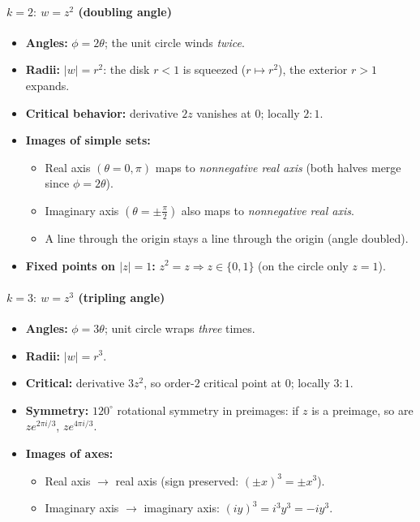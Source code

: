 \documentclass[11pt]{article}
\begin{document}
\paragraph{\(k=2:\ w=z^{2}\) (doubling angle)}
\begin{itemize}
	\item \textbf{Angles:} \(\phi=2\theta\); the unit circle winds \emph{twice}.
	\item \textbf{Radii:} \(|w|=r^{2}\): the disk \(r<1\) is squeezed (\(r\mapsto r^{2}\)), the exterior \(r>1\) expands.
	\item \textbf{Critical behavior:} derivative \(2z\) vanishes at \(0\); locally \(2{:}1\).
	\item \textbf{Images of simple sets:}
	\begin{itemize}
		\item Real axis \((\theta=0,\pi)\) maps to \emph{nonnegative real axis} (both halves merge since \(\phi=2\theta\)).
		\item Imaginary axis \((\theta=\pm \tfrac{\pi}{2})\) also maps to \emph{nonnegative real axis}.
		\item A line through the origin stays a line through the origin (angle doubled).
	\end{itemize}
	\item \textbf{Fixed points on \(|z|=1\):} \(z^{2}=z \Rightarrow z\in\{0,1\}\) (on the circle only \(z=1\)).
\end{itemize}

\paragraph{\(k=3:\ w=z^{3}\) (tripling angle)}
\begin{itemize}
	\item \textbf{Angles:} \(\phi=3\theta\); unit circle wraps \emph{three} times.
	\item \textbf{Radii:} \(|w|=r^{3}\).
	\item \textbf{Critical:} derivative \(3z^{2}\), so order-\(2\) critical point at \(0\); locally \(3{:}1\).
	\item \textbf{Symmetry:} \(120^{\circ}\) rotational symmetry in preimages: if \(z\) is a preimage, so are \(ze^{2\pi i/3}\), \(ze^{4\pi i/3}\).
	\item \textbf{Images of axes:}
	\begin{itemize}
		\item Real axis \(\to\) real axis (sign preserved: \((\pm x)^{3}=\pm x^{3}\)).
		\item Imaginary axis \(\to\) imaginary axis: \((iy)^{3}=i^{3}y^{3}=-iy^{3}\).
	\end{itemize}
\end{itemize}
\end{document}
